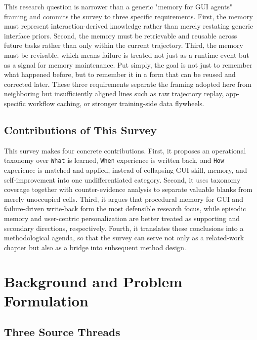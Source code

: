 \documentclass{article}
\begin{document}
This research question is narrower than a generic "memory for GUI
agents" framing and commits the survey to three specific requirements.
First, the memory must represent interaction-derived knowledge rather
than merely restating generic interface priors. Second, the memory must
be retrievable and reusable across future tasks rather than only within
the current trajectory. Third, the memory must be revisable, which means
failure is treated not just as a runtime event but as a signal for
memory maintenance. Put simply, the goal is not just to remember what
happened before, but to remember it in a form that can be reused and
corrected later. These three requirements separate the framing adopted
here from neighboring but insufficiently aligned lines such as raw
trajectory replay, app-specific workflow caching, or stronger
training-side data flywheels.

\subsection{Contributions of This Survey}\label{24-contributions-of-this-survey}

This survey makes four concrete contributions. First, it proposes an
operational taxonomy over \texttt{What} is learned, \texttt{When}
experience is written back, and \texttt{How} experience is matched and
applied, instead of collapsing GUI skill, memory, and self-improvement
into one undifferentiated category. Second, it uses taxonomy coverage
together with counter-evidence analysis to separate valuable blanks from
merely unoccupied cells. Third, it argues that procedural memory for GUI
and failure-driven write-back form the most defensible research focus,
while episodic memory and user-centric personalization are better
treated as supporting and secondary directions, respectively. Fourth, it
translates these conclusions into a methodological agenda, so that the
survey can serve not only as a related-work chapter but also as a bridge
into subsequent method design.

\section{Background and Problem Formulation}\label{3-background-and-problem-formulation}

\subsection{Three Source Threads}\label{31-three-source-threads}
\end{document}
